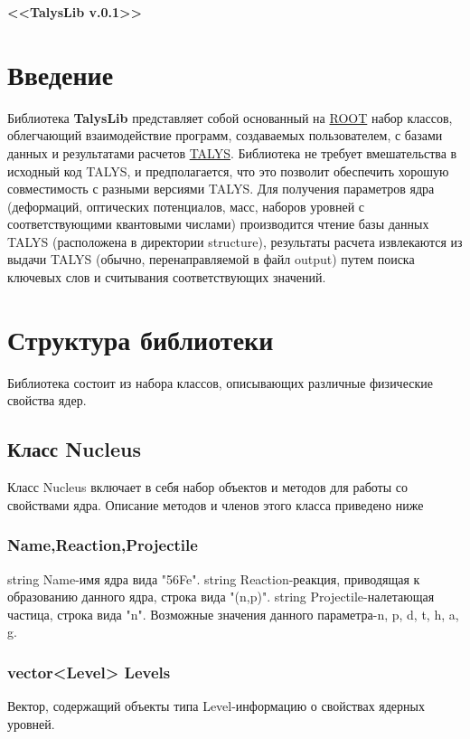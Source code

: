 \documentclass[a4paper,12pt]{extarticle}
\begin{document}
\begin{titlepage}
\pagestyle{empty} %
\begin{center}
\vspace{4cm}
\Large{\textbf{<<TalysLib v.0.1>>}}\\
\vspace{1.6cm}
\newpage
\end{center}
\tableofcontents%
\end{titlepage}
\section{Введение}
Библиотека \textbf{TalysLib} представляет собой основанный на \href{https://root.cern/}{ROOT} набор классов, облегчающий взаимодействие программ, создаваемых пользователем, с базами данных и результатами расчетов \href{https://tendl.web.psi.ch/tendl_2019/talys.html}{TALYS}. Библиотека не требует вмешательства в исходный код TALYS, и предполагается, что это позволит обеспечить хорошую совместимость с разными версиями TALYS. Для получения параметров ядра (деформаций, оптических потенциалов, масс, наборов уровней с соответствующими квантовыми числами) производится чтение базы данных TALYS (расположена в директории structure), результаты расчета извлекаются из выдачи TALYS (обычно, перенаправляемой в файл output) путем поиска ключевых слов и считывания соответствующих значений.
\section{Структура библиотеки}
Библиотека состоит из набора классов, описывающих различные физические свойства ядер. 
\subsection{Класс Nucleus}
Класс Nucleus включает в себя набор объектов и методов для работы со свойствами ядра. Описание методов и членов этого класса приведено ниже
\subsubsection{Name,Reaction,Projectile}
string Name-имя ядра вида "56Fe". string Reaction-реакция, приводящая к образованию данного ядра, строка вида "(n,p)". string Projectile-налетающая частица, строка вида "n". Возможные значения данного параметра-n, p, d, t, h, a, g.
\subsubsection{vector<Level> Levels}
Вектор, содержащий объекты типа Level-информацию о свойствах ядерных уровней.
\end{document}
